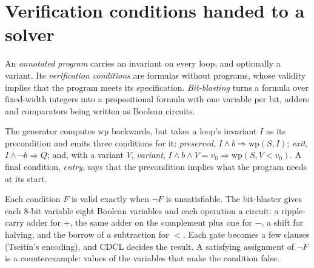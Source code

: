 \section{Verification conditions handed to a solver}\label{sec:b3:program-verification:vc}

\begin{definition}\label{def:b3:program-verification:vc}
An \emph{annotated program} carries an invariant on every loop, and optionally a variant. Its \emph{verification conditions} are formulas without programs, whose validity implies that the program meets its specification. \emph{Bit-blasting} turns a formula over fixed-width integers into a propositional formula with one variable per bit, adders and comparators being written as Boolean circuits.
\end{definition}

The generator computes wp backwards, but takes a loop's invariant $I$ as its precondition and emits three conditions for it: \emph{preserved}, $I \wedge b \Rightarrow \mathrm{wp}(S, I)$; \emph{exit}, $I \wedge \neg b \Rightarrow Q$; and, with a variant $V$, \emph{variant}, $I \wedge b \wedge V = v_0 \Rightarrow \mathrm{wp}(S, V < v_0)$. A final condition, \emph{entry}, says that the precondition implies what the program needs at its start.

\label{lst:b3:program-verification:vcgen}

Each condition $F$ is valid exactly when $\neg F$ is unsatisfiable. The bit-blaster gives each 8-bit variable eight Boolean variables and each operation a circuit: a ripple-carry adder for $+$, the same adder on the complement plus one for $-$, a shift for halving, and the borrow of a subtraction for $<$. Each gate becomes a few clauses (Tseitin's encoding), and CDCL decides the result. A satisfying assignment of $\neg F$ is a counterexample: values of the variables that make the condition false.

\label{lst:b3:program-verification:bitblast}

